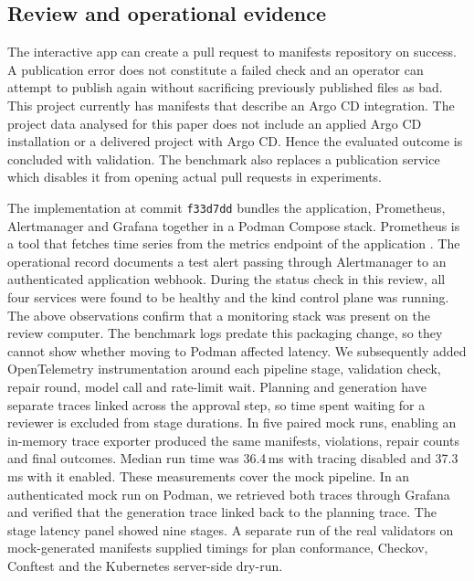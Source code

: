 \documentclass[12pt,onecolumn,draftclsnofoot]{IEEEtran}
\begin{document}
\subsection{Review and operational evidence}
The interactive app can create a pull request to manifests repository on success. A publication error does not constitute a failed check and an operator can attempt to publish again without sacrificing previously published files as bad. This project currently has manifests that describe an Argo CD integration. The project data analysed for this paper does not include an applied Argo CD installation or a delivered project with Argo CD. Hence the evaluated outcome is concluded with validation. The benchmark also replaces a publication service which disables it from opening actual pull requests in experiments.


The implementation at commit \texttt{f33d7dd} bundles the application, Prometheus, Alertmanager and Grafana together in a Podman Compose stack. Prometheus is a tool that fetches time series from the metrics endpoint of the application \cite{prom}. The operational record documents a test alert passing through Alertmanager to an authenticated application webhook. During the status check in this review, all four services were found to be healthy and the kind control plane was running. The above observations confirm that a monitoring stack was present on the review computer. The benchmark logs predate this packaging change, so they cannot show whether moving to Podman affected latency. We subsequently added OpenTelemetry instrumentation around each pipeline stage, validation check, repair round, model call and rate-limit wait. Planning and generation have separate traces linked across the approval step, so time spent waiting for a reviewer is excluded from stage durations. In five paired mock runs, enabling an in-memory trace exporter produced the same manifests, violations, repair counts and final outcomes. Median run time was 36.4\,ms with tracing disabled and 37.3\,ms with it enabled. These measurements cover the mock pipeline. In an authenticated mock run on Podman, we retrieved both traces through Grafana and verified that the generation trace linked back to the planning trace. The stage latency panel showed nine stages. A separate run of the real validators on mock-generated manifests supplied timings for plan conformance, Checkov, Conftest and the Kubernetes server-side dry-run.
\end{document}
